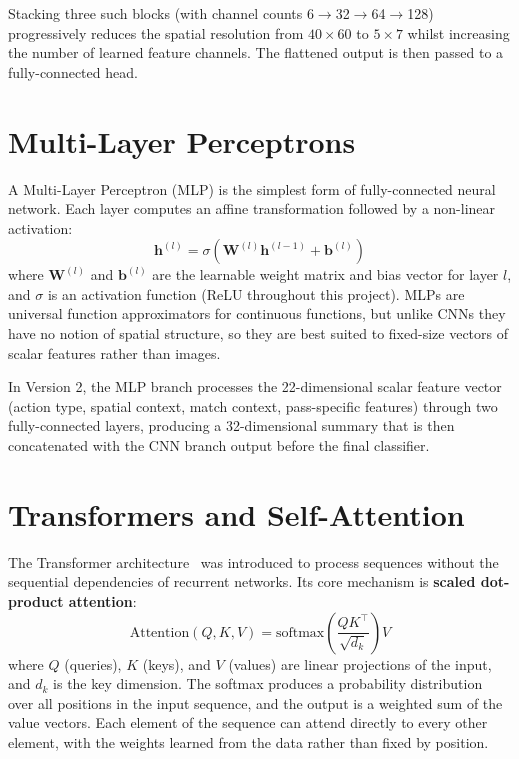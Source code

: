 Stacking three such blocks (with channel counts 6$\to$32$\to$64$\to$128) progressively reduces the spatial resolution from $40\times60$ to $5\times7$ whilst increasing the number of learned feature channels. The flattened output is then passed to a fully-connected head.

\section{Multi-Layer Perceptrons}\label{sec:meth_mlp}

A Multi-Layer Perceptron (MLP) is the simplest form of fully-connected neural network. Each layer computes an affine transformation followed by a non-linear activation:
\[
    \mathbf{h}^{(l)} = \sigma\!\left(\mathbf{W}^{(l)}\mathbf{h}^{(l-1)} + \mathbf{b}^{(l)}\right)
\]
where $\mathbf{W}^{(l)}$ and $\mathbf{b}^{(l)}$ are the learnable weight matrix and bias vector for layer $l$, and $\sigma$ is an activation function (ReLU throughout this project). MLPs are universal function approximators for continuous functions, but unlike CNNs they have no notion of spatial structure, so they are best suited to fixed-size vectors of scalar features rather than images.

In Version 2, the MLP branch processes the 22-dimensional scalar feature vector (action type, spatial context, match context, pass-specific features) through two fully-connected layers, producing a 32-dimensional summary that is then concatenated with the CNN branch output before the final classifier.

\section{Transformers and Self-Attention}\label{sec:meth_transformer}

The Transformer architecture~\cite{vaswani2017} was introduced to process sequences without the sequential dependencies of recurrent networks. Its core mechanism is \textbf{scaled dot-product attention}:
\[
    \text{Attention}(Q, K, V) = \text{softmax}\!\left(\frac{QK^\top}{\sqrt{d_k}}\right)V
\]
where $Q$ (queries), $K$ (keys), and $V$ (values) are linear projections of the input, and $d_k$ is the key dimension. The softmax produces a probability distribution over all positions in the input sequence, and the output is a weighted sum of the value vectors. Each element of the sequence can attend directly to every other element, with the weights learned from the data rather than fixed by position.


